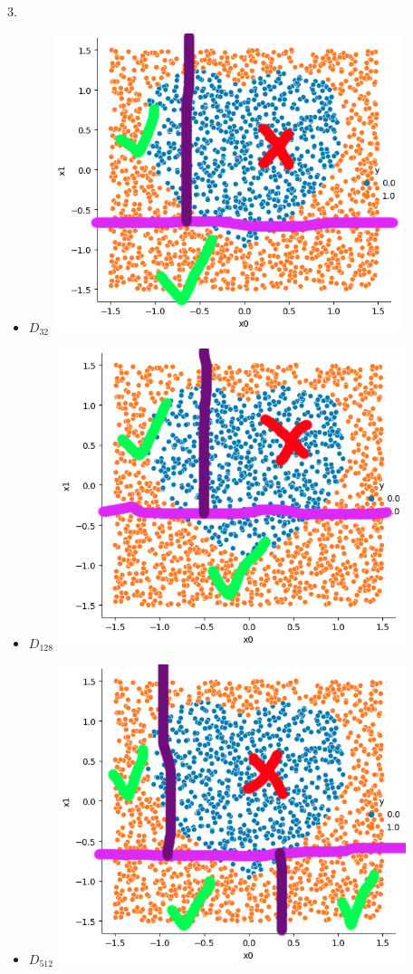\documentclass[a4paper]{article}
\theoremstyle{definition}
\begin{document}
\begin{enumerate}
\begin{itemize}
    3.
    \begin{itemize}
        \item $D_{32}$ \includegraphics[width=0.8\textwidth]{hw2/2_7_3_1.png}\\
        \item $D_{128}$ \includegraphics[width=0.8\textwidth]{hw2/2_7_3_2.png}\\
        \item $D_{512}$ \includegraphics[width=0.8\textwidth]{hw2/2_7_3_3.png}\\

\end{itemize}
\end{itemize}
\end{enumerate}
\end{document}

